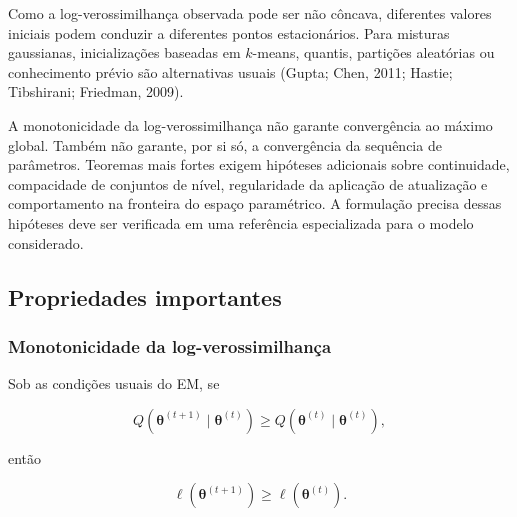 \documentclass[
  letterpaper,
  DIV=11,
  numbers=noendperiod]{scrreprt}
\begin{document}
Como a log-verossimilhança observada pode ser não côncava, diferentes
valores iniciais podem conduzir a diferentes pontos estacionários. Para
misturas gaussianas, inicializações baseadas em \(k\)-means, quantis,
partições aleatórias ou conhecimento prévio são alternativas usuais
(Gupta; Chen, 2011; Hastie; Tibshirani; Friedman, 2009).

\begin{tcolorbox}[enhanced jigsaw, colback=white, leftrule=.75mm, colbacktitle=quarto-callout-warning-color!10!white, breakable, titlerule=0mm, bottomtitle=1mm, title=\textcolor{quarto-callout-warning-color}{\faExclamationTriangle}\hspace{0.5em}{Observação --- escopo das garantias}, colframe=quarto-callout-warning-color-frame, toprule=.15mm, opacityback=0, bottomrule=.15mm, opacitybacktitle=0.6, arc=.35mm, toptitle=1mm, rightrule=.15mm, coltitle=black, left=2mm]

A monotonicidade da log-verossimilhança não garante convergência ao
máximo global. Também não garante, por si só, a convergência da
sequência de parâmetros. Teoremas mais fortes exigem hipóteses
adicionais sobre continuidade, compacidade de conjuntos de nível,
regularidade da aplicação de atualização e comportamento na fronteira do
espaço paramétrico. A formulação precisa dessas hipóteses deve ser
verificada em uma referência especializada para o modelo considerado.

\end{tcolorbox}

\subsection{Propriedades importantes}\label{propriedades-importantes-1}

\subsubsection{Monotonicidade da
log-verossimilhança}\label{monotonicidade-da-log-verossimilhanuxe7a}

\begin{tcolorbox}[enhanced jigsaw, colback=white, leftrule=.75mm, colbacktitle=quarto-callout-important-color!10!white, breakable, titlerule=0mm, bottomtitle=1mm, title=\textcolor{quarto-callout-important-color}{\faExclamation}\hspace{0.5em}{Propriedade --- monotonicidade}, colframe=quarto-callout-important-color-frame, toprule=.15mm, opacityback=0, bottomrule=.15mm, opacitybacktitle=0.6, arc=.35mm, toptitle=1mm, rightrule=.15mm, coltitle=black, left=2mm]

Sob as condições usuais do EM, se

\[Q(\boldsymbol{\theta}^{(t+1)}\mid\boldsymbol{\theta}^{(t)})
\geq
Q(\boldsymbol{\theta}^{(t)}\mid\boldsymbol{\theta}^{(t)}),\]

então

\[\ell(\boldsymbol{\theta}^{(t+1)})
\geq
\ell(\boldsymbol{\theta}^{(t)}).\]

\end{tcolorbox}
\end{document}

